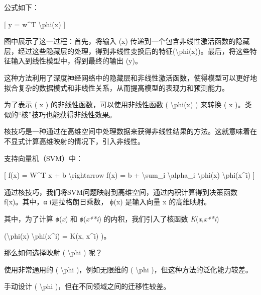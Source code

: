 公式如下：

{[} y = w\^{}T \textbackslash phi(x) {]}


图中展示了这一过程：首先，将输入 (x)
传递到一个包含非线性激活函数的隐藏层，经过这些隐藏层的处理，得到非线性变换后的特征(\textbackslash phi(x))。最后，将这些特征输入到线性模型中，得到最终的输出
(y)。


这种方法利用了深度神经网络中的隐藏层和非线性激活函数，使得模型可以更好地拟合复杂的数据模式和非线性关系，从而提高模型的表现力和预测能力。

为了表示 ( x ) 的非线性函数，可以使用非线性函数 ( \textbackslash phi(x)
) 来转换 ( x )。类似的``核''技巧也能获得非线性效果。

核技巧是一种通过在高维空间中处理数据来获得非线性结果的方法。这就意味着在不显式计算高维映射的情况下，引入非线性。

支持向量机（SVM）中：

{[} f(x) = W\^{}T x + b \textbackslash rightarrow f(x) = b +
\textbackslash sum\_i \textbackslash alpha\_i \textbackslash phi(x)
\textbackslash phi(x\^{}i) {]}


通过核技巧，我们将SVM问题映射到高维空间，通过内积计算得到决策函数
f(x)。其中，α i是拉格朗日乘数， ϕ(x) 是输入向量 x 的高维映射。

其中，为了计算 \emph{ϕ}(\emph{x}) 和 \emph{ϕ}(\emph{x**i})
的内积，我们引入了核函数 \emph{K}(\emph{x},\emph{x**i})

(\textbackslash phi(x) \textbackslash phi(x\^{}i) = K(x, x\^{}i) )。


那么如何选择映射 ( \textbackslash phi ) 呢？

使用非常通用的 ( \textbackslash phi )，例如无限维的 ( \textbackslash phi
)，但这种方法的泛化能力较差。

手动设计 ( \textbackslash phi )，但在不同领域之间的迁移性较差。

